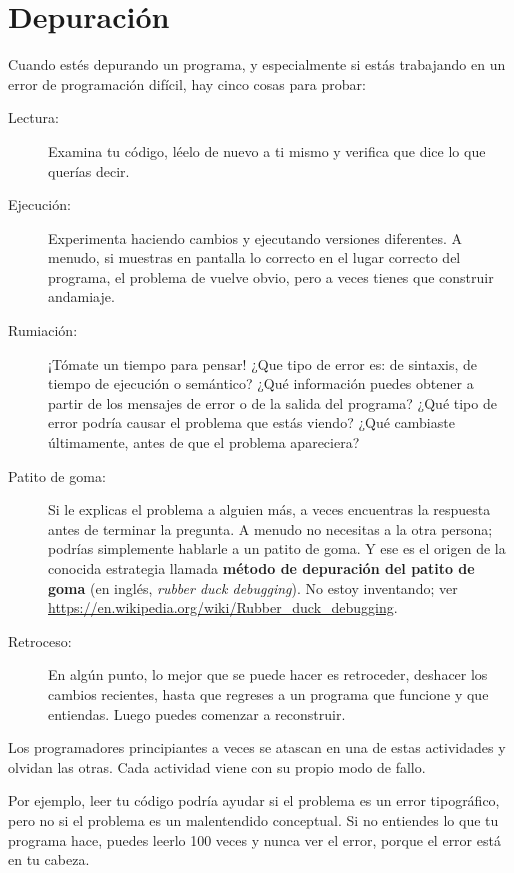 \documentclass[10pt]{book}
\begin{document}
\section{Depuración}

Cuando estés depurando un programa, y especialmente si estás
trabajando en un error de programación difícil, hay cinco cosas para probar:

\begin{description}

\item[Lectura:] Examina tu código, léelo de nuevo a ti mismo y
verifica que dice lo que querías decir.

\item[Ejecución:] Experimenta haciendo cambios y ejecutando versiones
diferentes.  A menudo, si muestras en pantalla lo correcto en el lugar correcto
del programa, el problema de vuelve obvio, pero a veces tienes que
construir andamiaje.

\item[Rumiación:] ¡Tómate un tiempo para pensar!  ¿Que tipo de error
es: de sintaxis, de tiempo de ejecución o semántico?  ¿Qué información puedes obtener a partir
de los mensajes de error o de la salida del programa?  ¿Qué tipo de
error podría causar el problema que estás viendo?  ¿Qué cambiaste
últimamente, antes de que el problema apareciera?

\item[Patito de goma:] Si le explicas el problema a alguien más,
  a veces encuentras la respuesta antes de terminar la pregunta.
  A menudo no necesitas a la otra persona; podrías simplemente hablarle a un
  patito de goma.  Y ese es el origen de la conocida estrategia llamada {\bf
  método de depuración del patito de goma} (en inglés, {\em rubber duck debugging}).
  No estoy inventando; ver \url{https://en.wikipedia.org/wiki/Rubber_duck_debugging}.

\item[Retroceso:] En algún punto, lo mejor que se puede hacer es
retroceder, deshacer los cambios recientes, hasta que regreses a un programa que
funcione y que entiendas.  Luego puedes comenzar a reconstruir.

\end{description}

Los programadores principiantes a veces se atascan en una de estas actividades
y olvidan las otras.  Cada actividad viene con su propio modo
de fallo.

Por ejemplo, leer tu código podría ayudar si el problema es un
error tipográfico, pero no si el problema es un malentendido
conceptual.  Si no entiendes lo que tu programa hace,
puedes leerlo 100 veces y nunca ver el error, porque el error está en
tu cabeza.
\end{document}

